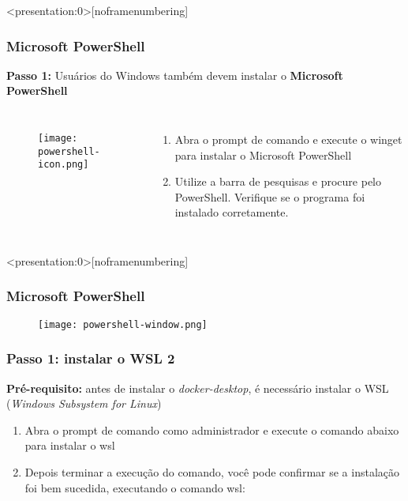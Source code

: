 \documentclass[t, 10pt, aspectratio=169, table, x11names]{beamer}
\begin{document}
	\begin{frame}<presentation:0>[noframenumbering]
		\frametitle{Microsoft PowerShell}
		\textbf{Passo 1:} Usuários do Windows também devem instalar o \textbf{Microsoft PowerShell}
		\vspace{0.6cm}
		\begin{columns}
			\begin{figure}[h]
				\texttt{[image: powershell-icon.png]}
			\end{figure}
			\begin{enumerate}
				\item Abra o prompt de comando e execute o winget para instalar o Microsoft PowerShell
				
				\vspace{0.4cm}
				\item Utilize a barra de pesquisas e procure pelo PowerShell. Verifique se o programa foi instalado corretamente.
			\end{enumerate}
		\end{columns}
	\end{frame}
	
	\begin{frame}<presentation:0>[noframenumbering]
		\frametitle{Microsoft PowerShell}
		\vspace{0.5cm}
		\begin{figure}[h]
			\texttt{[image: powershell-window.png]}
		\end{figure}
	\end{frame}

	\begin{frame}
		\frametitle{Passo 1: instalar o WSL 2}
		\textbf{Pré-requisito:} antes de instalar o \textit{docker-desktop}, é necessário instalar o WSL (\textit{Windows Subsystem for Linux})
		\begin{enumerate}
			\item Abra o prompt de comando como administrador e execute o comando abaixo para instalar o wsl
			
			\vspace{0.4cm}
			\item Depois terminar a execução do comando, você pode confirmar se a instalação foi bem sucedida, executando o comando wsl:
			
		\end{enumerate}
	\end{frame}
\end{document}

